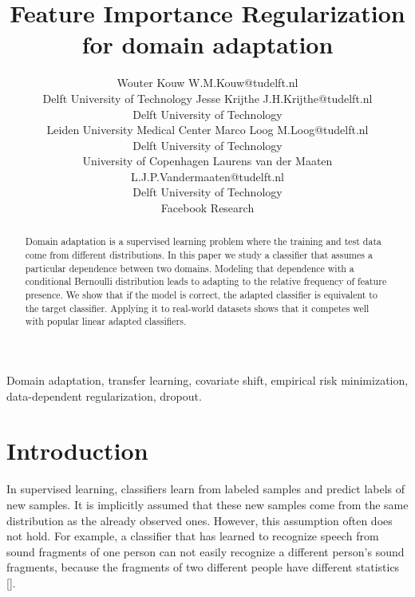 \documentclass[twoside,11pt]{article}
\begin{document}
\title{Feature Importance Regularization \\ for domain adaptation}

\author{\name Wouter Kouw \email W.M.Kouw@tudelft.nl \\
       Delft University of Technology
       \AND
       \name Jesse Krijthe \email J.H.Krijthe@tudelft.nl \\
       Delft University of Technology  \\
       Leiden University Medical Center
       \AND
       \name Marco Loog \email M.Loog@tudelft.nl \\
       Delft University of Technology \\
       University of Copenhagen
       \AND
       \name Laurens van der Maaten \email L.J.P.Vandermaaten@tudelft.nl \\
       Delft University of Technology \\
       Facebook Research
}


\maketitle

\begin{abstract}%
Domain adaptation is a supervised learning problem where the training and test data come from different distributions. In this paper we study a classifier that assumes a particular dependence between two domains. Modeling that dependence with a conditional Bernoulli	 distribution leads to adapting to the relative frequency of feature presence. We show that if the model is correct, the adapted classifier is equivalent to the target classifier. Applying it to real-world datasets shows that it competes well with popular linear adapted classifiers.
\end{abstract}

\begin{keywords}
Domain adaptation, transfer learning, covariate shift, empirical risk minimization, data-dependent regularization, dropout.
\end{keywords}

\section{Introduction}

In supervised learning, classifiers learn from labeled samples and predict labels of new samples. It is implicitly assumed that these new samples come from the same distribution as the already observed ones. However, this assumption often does not hold. For example, a classifier that has learned to recognize speech from sound fragments of one person can not easily recognize a different person's sound fragments, because the fragments of two different people have different statistics [\cite{leggetter1995maximum}]. 
\end{document}
